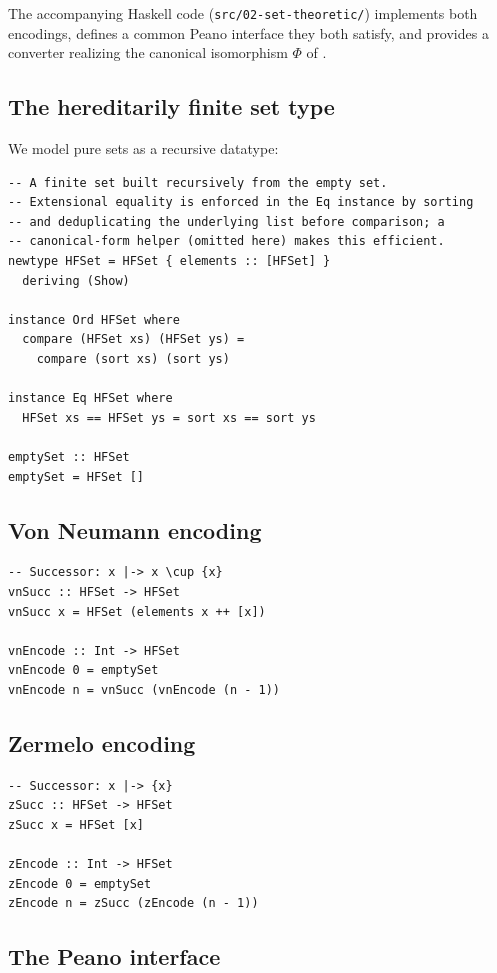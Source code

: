 \documentclass[12pt]{article}
\theoremstyle{definition}
\theoremstyle{remark}
\begin{document}
The accompanying Haskell code (\texttt{src/02-set-theoretic/}) implements
both encodings, defines a common Peano interface they both satisfy, and
provides a converter realizing the canonical isomorphism $\Phi$ of
.

\subsection{The hereditarily finite set type}

We model pure sets as a recursive datatype:

\begin{lstlisting}
-- A finite set built recursively from the empty set.
-- Extensional equality is enforced in the Eq instance by sorting
-- and deduplicating the underlying list before comparison; a
-- canonical-form helper (omitted here) makes this efficient.
newtype HFSet = HFSet { elements :: [HFSet] }
  deriving (Show)

instance Ord HFSet where
  compare (HFSet xs) (HFSet ys) =
    compare (sort xs) (sort ys)

instance Eq HFSet where
  HFSet xs == HFSet ys = sort xs == sort ys

emptySet :: HFSet
emptySet = HFSet []
\end{lstlisting}

\subsection{Von Neumann encoding}

\begin{lstlisting}
-- Successor: x |-> x \cup {x}
vnSucc :: HFSet -> HFSet
vnSucc x = HFSet (elements x ++ [x])

vnEncode :: Int -> HFSet
vnEncode 0 = emptySet
vnEncode n = vnSucc (vnEncode (n - 1))
\end{lstlisting}

\subsection{Zermelo encoding}

\begin{lstlisting}
-- Successor: x |-> {x}
zSucc :: HFSet -> HFSet
zSucc x = HFSet [x]

zEncode :: Int -> HFSet
zEncode 0 = emptySet
zEncode n = zSucc (zEncode (n - 1))
\end{lstlisting}

\subsection{The Peano interface}
\end{document}
